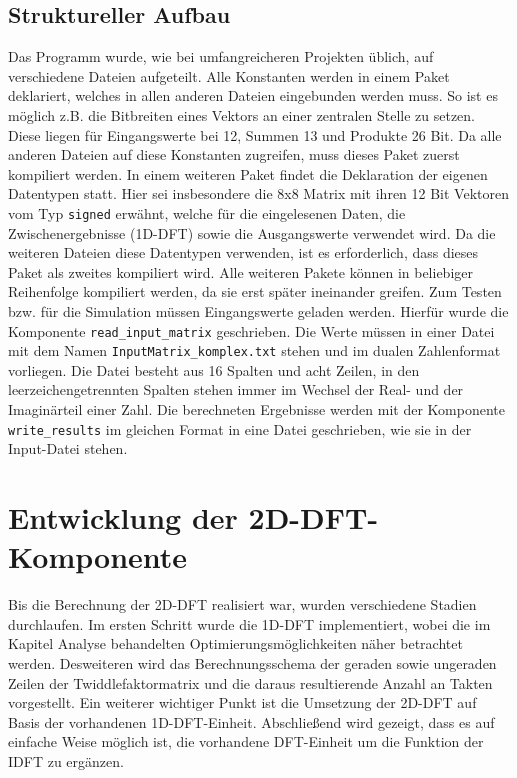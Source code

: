 \subsection{Struktureller Aufbau}
 Das Programm wurde, wie bei umfangreicheren Projekten üblich, auf verschiedene Dateien aufgeteilt. Alle Konstanten werden in einem Paket deklariert, welches in allen anderen Dateien
 eingebunden werden muss. So ist es möglich z.B. die Bitbreiten eines Vektors an einer zentralen Stelle zu setzen. Diese liegen für 
 Eingangswerte bei 12, Summen 13 und Produkte 26 Bit. Da alle anderen Dateien auf diese
 Konstanten zugreifen, muss dieses Paket zuerst kompiliert werden. In einem weiteren Paket findet die Deklaration der eigenen Datentypen statt. Hier sei
 insbesondere die 8x8 Matrix mit ihren 12 Bit Vektoren vom Typ \texttt{signed} erwähnt, welche für die eingelesenen 
 Daten, die Zwischenergebnisse (1D-DFT) sowie die Ausgangswerte verwendet wird.
 Da die weiteren Dateien diese Datentypen verwenden, ist es 
 erforderlich, dass dieses Paket als zweites kompiliert wird. Alle weiteren Pakete können in beliebiger Reihenfolge kompiliert werden, da sie erst später ineinander
 greifen. 
 Zum Testen bzw. für die Simulation müssen Eingangswerte geladen werden. Hierfür wurde die Komponente \texttt{read\_input\_matrix} geschrieben. Die Werte müssen
 in einer Datei mit dem Namen \texttt{InputMatrix\_komplex.txt} stehen und im dualen Zahlenformat vorliegen. 
 Die Datei besteht aus 16 Spalten und acht Zeilen, in den leerzeichengetrennten Spalten stehen immer im Wechsel der Real- und der Imaginärteil einer Zahl.
  Die berechneten Ergebnisse werden mit der Komponente \texttt{write\_results} im gleichen Format in eine Datei geschrieben, wie sie in der Input-Datei stehen. 



\section{Entwicklung der 2D-DFT-Komponente}
Bis die Berechnung der 2D-DFT realisiert war, wurden verschiedene Stadien durchlaufen. Im ersten Schritt wurde die 1D-DFT implementiert, wobei die im Kapitel
Analyse behandelten Optimierungsmöglichkeiten näher betrachtet werden. Desweiteren wird das Berechnungsschema der geraden sowie ungeraden Zeilen der 
Twiddlefaktormatrix und die daraus resultierende Anzahl an Takten vorgestellt.
Ein weiterer wichtiger Punkt ist die Umsetzung der 2D-DFT auf Basis der vorhandenen 1D-DFT-Einheit.
Abschließend wird gezeigt, dass es auf einfache Weise möglich ist, die vorhandene DFT-Einheit um die Funktion der IDFT zu ergänzen.




